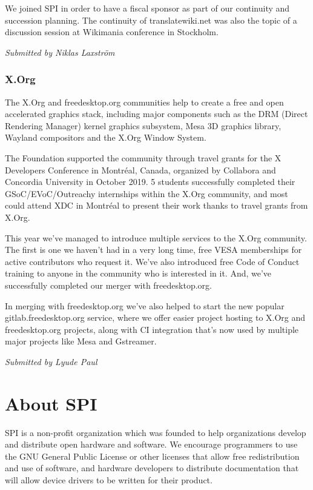 \documentclass[a4paper]{report}
\begin{document}
We joined SPI in order to have a fiscal sponsor as part of our
continuity and succession planning. The continuity of translatewiki.net
was also the topic of a discussion session at Wikimania conference in
Stockholm.

{\em Submitted by Niklas Laxström}

\subsection{X.Org}

The X.Org and freedesktop.org communities help to create a free and open
accelerated graphics stack, including major components such as the DRM
(Direct Rendering Manager) kernel graphics subsystem, Mesa 3D graphics
library, Wayland compositors and the X.Org Window System.

The Foundation supported the community through travel grants for the X
Developers Conference in Montréal, Canada, organized by Collabora and
Concordia University in October 2019. 5 students successfully completed
their GSoC/EVoC/Outreachy internships within the X.Org community, and
most could attend XDC in Montréal to present their work thanks to travel
grants from X.Org.

This year we've managed to introduce multiple services to the X.Org
community.  The first is one we haven't had in a very long time, free
VESA memberships for active contributors who request it. We've also
introduced free Code of Conduct training to anyone in the community who
is interested in it. And, we've successfully completed our merger with
freedesktop.org.

In merging with freedesktop.org we've also helped to start the new
popular gitlab.freedesktop.org service, where we offer easier project
hosting to X.Org and freedesktop.org projects, along with CI integration
that's now used by multiple major projects like Mesa and Gstreamer.

{\em Submitted by Lyude Paul}


\appendix
\chapter{About SPI}

SPI is a non-profit organization which was founded to help organizations
develop and distribute open hardware and software. We encourage programmers
to use the GNU General Public License or other licenses that allow free
redistribution and use of software, and hardware developers to distribute
documentation that will allow device drivers to be written for their product.
\end{document}
